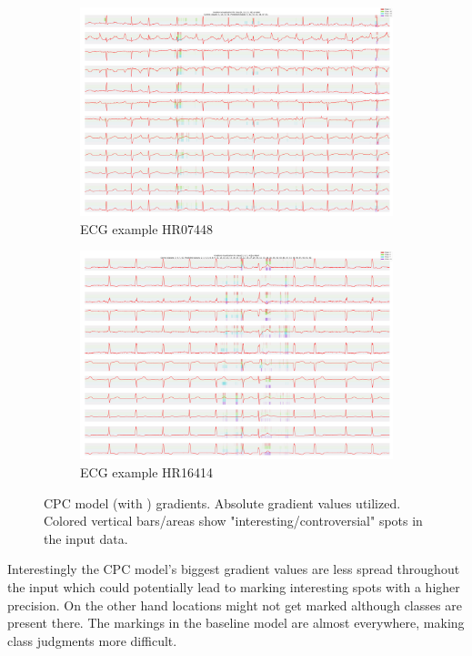 \begin{figure}
	\begin{subfigure}{1\textwidth}\centering
		\includegraphics[width=\linewidth]{"bilder/HR07448-class:[4, 16, 33, 41]-gradient-camcpc2.png"}
		\caption{ECG example HR07448}
		\centering
	\end{subfigure}
	\begin{subfigure}{1\textwidth}\centering
		\includegraphics[width=\linewidth]{"bilder/HR16414-class:[3, 6, 7, 41]-gradient-camcpc2.png"}
		\caption{ECG example HR16414}
		\centering
	\end{subfigure}
	\caption{CPC model (with ) gradients. Absolute gradient values utilized. Colored vertical bars/areas show "interesting/controversial" spots in the input data.}
	\label{explain-cpc}
\end{figure}
Interestingly the CPC model's biggest gradient values are less spread throughout the input which could potentially lead to marking interesting spots with a higher precision. On the other hand locations might not get marked although classes are present there. The markings in the baseline model are almost everywhere, making class judgments more difficult.


